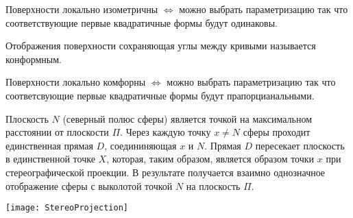 \begin{theorem}
  Поверхности локально изометричны $\Leftrightarrow$ можно выбрать
  параметризацию так что соответствующие первые квадратичные формы будут
  одинаковы.
\end{theorem}

\begin{define}
  Отображения поверхности сохраняющая углы между кривыми называется
  конформным.
\end{define}

\begin{theorem}
  Поверхности локально комфорны $\Leftrightarrow$ можно выбрать
  параметризацию так что соответсвующие первые квадратичные формы будут
  прапорцианальными.
\end{theorem}

\begin{define}
  Плоскость $N$ (северный полюс сферы) является точкой на максимальном
  расстоянии от плоскости $\Pi$. Через каждую точку $x \not= N$ сферы проходит
  единственная прямая $D$, соедининяющая $x$ и $N$. Прямая $D$ пересекает
  плоскость в единственной точке $X$, которая, таким образом, является образом
  точки $x$ при стереографической проекции. В результате получается взаимно
  однозначное отображение сферы с выколотой точкой $N$ на плоскость $\Pi$.

  \texttt{[image: StereoProjection]}
\end{define}